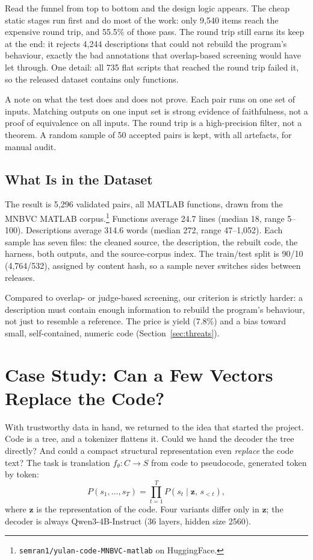 \documentclass[conference]{IEEEtran}
\newcommand{\NAccepted}{5{,}296}           %
\newcommand{\NTrain}{4{,}764}
\newcommand{\NTest}{532}
\begin{document}
Read the funnel from top to bottom and the design logic appears. The cheap static stages run first and do most of the work: only 9{,}540 items reach the expensive round trip, and 55.5\% of those pass. The round trip still earns its keep at the end: it rejects 4{,}244 descriptions that could not rebuild the program's behaviour, exactly the bad annotations that overlap-based screening would have let through. One detail: all 735 flat scripts that reached the round trip failed it, so the released dataset contains only functions.

A note on what the test does and does not prove. Each pair runs on one set of inputs. Matching outputs on one input set is strong evidence of faithfulness, not a proof of equivalence on all inputs. The round trip is a high-precision filter, not a theorem. A random sample of 50 accepted pairs is kept, with all artefacts, for manual audit.

\subsection{What Is in the Dataset}
\label{sec:characterization}
The result is \NAccepted{} validated pairs, all MATLAB functions, drawn from the MNBVC MATLAB corpus.\footnote{\texttt{semran1/yulan-code-MNBVC-matlab} on HuggingFace.} Functions average 24.7 lines (median 18, range 5--100). Descriptions average 314.6 words (median 272, range 47--1{,}052). Each sample has seven files: the cleaned source, the description, the rebuilt code, the harness, both outputs, and the source-corpus index. The train/test split is 90/10 (\NTrain{}/\NTest{}), assigned by content hash, so a sample never switches sides between releases.

Compared to overlap- or judge-based screening, our criterion is strictly harder: a description must contain enough information to rebuild the program's behaviour, not just to resemble a reference. The price is yield (7.8\%) and a bias toward small, self-contained, numeric code (Section~\ref{sec:threats}).

\section{Case Study: Can a Few Vectors Replace the Code?}
\label{sec:models}

With trustworthy data in hand, we returned to the idea that started the project. Code is a tree, and a tokenizer flattens it. Could we hand the decoder the tree directly? And could a compact structural representation even \emph{replace} the code text? The task is translation $f_{\theta}: C \rightarrow S$ from code to pseudocode, generated token by token:
\begin{equation}
  P(s_1, \ldots, s_T) = \prod_{t=1}^{T} P(s_t \mid \mathbf{z},\, s_{<t}),
\end{equation}
where $\mathbf{z}$ is the representation of the code. Four variants differ only in $\mathbf{z}$; the decoder is always Qwen3-4B-Instruct \cite{qwen3technicalreport} (36 layers, hidden size 2560).
\end{document}
